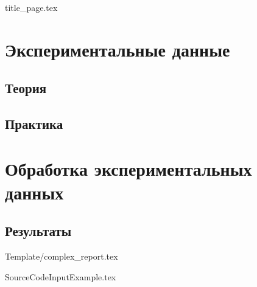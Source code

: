 


{title_page.tex}


\setcounter{page}{2}
\tableofcontents

\newpage
\section{Экспериментальные данные}
\subsection{Теория}
\lipsum[2-4]

\subsection{Практика}
\lipsum[2-4]

\section{Обработка экспериментальных данных}
\subsection{Результаты}
\lipsum[2-4]
\cite{Collaboration2020}
\cite{Reissel2016}

\newpage
{Template/complex_report.tex}

\newpage
{SourceCodeInputExample.tex}

\newpage
\printbibliography[
heading=bibintoc,
]
\printbibliography[
heading=subbibintoc,
title={Subbibliography}
]


